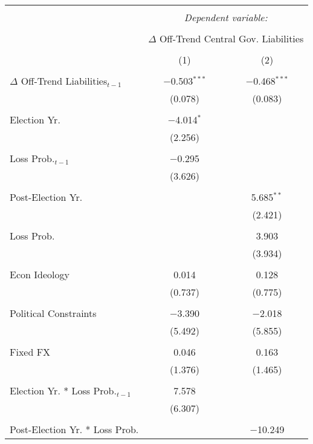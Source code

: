 
\begingroup 
\tiny 
\begin{tabular}{@{\extracolsep{5pt}}lcc} 
\\[-1.8ex]\hline 
\hline \\[-1.8ex] 
 & \multicolumn{2}{c}{\textit{Dependent variable:}} \\ 
\cline{2-3} 
\\[-1.8ex] & \multicolumn{2}{c}{$\Delta$ Off-Trend Central Gov. Liabilities} \\ 
\\[-1.8ex] & (1) & (2)\\ 
\hline \\[-1.8ex] 
 $\Delta$ Off-Trend Liabilities$_{t-1}$ & $-$0.503$^{***}$ & $-$0.468$^{***}$ \\ 
  & (0.078) & (0.083) \\ 
  & & \\ 
 Election Yr. & $-$4.014$^{*}$ &  \\ 
  & (2.256) &  \\ 
  & & \\ 
 Loss Prob.$_{t-1}$ & $-$0.295 &  \\ 
  & (3.626) &  \\ 
  & & \\ 
 Post-Election Yr. &  & 5.685$^{**}$ \\ 
  &  & (2.421) \\ 
  & & \\ 
 Loss Prob. &  & 3.903 \\ 
  &  & (3.934) \\ 
  & & \\ 
 Econ Ideology & 0.014 & 0.128 \\ 
  & (0.737) & (0.775) \\ 
  & & \\ 
 Political Constraints & $-$3.390 & $-$2.018 \\ 
  & (5.492) & (5.855) \\ 
  & & \\ 
 Fixed FX & 0.046 & 0.163 \\ 
  & (1.376) & (1.465) \\ 
  & & \\ 
 Election Yr. * Loss Prob.$_{t-1}$ & 7.578 &  \\ 
  & (6.307) &  \\ 
  & & \\ 
 Post-Election Yr. * Loss Prob. &  & $-$10.249 \\ 

\end{tabular}
